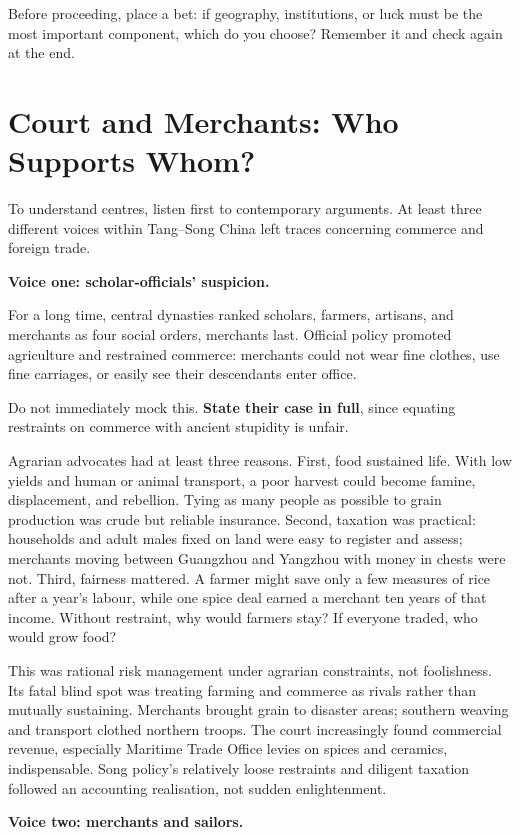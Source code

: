 Before proceeding, place a bet: if geography, institutions, or luck must be the most important component, which do you choose? Remember it and check again at the end.

\section{Court and Merchants: Who Supports Whom?}
To understand centres, listen first to contemporary arguments. At least three different voices within Tang--Song China left traces concerning commerce and foreign trade.

\textbf{Voice one: scholar-officials' suspicion.}

For a long time, central dynasties ranked scholars, farmers, artisans, and merchants as four social orders, merchants last. Official policy promoted agriculture and restrained commerce: merchants could not wear fine clothes, use fine carriages, or easily see their descendants enter office.

Do not immediately mock this. \textbf{State their case in full}, since equating restraints on commerce with ancient stupidity is unfair.

Agrarian advocates had at least three reasons. First, food sustained life. With low yields and human or animal transport, a poor harvest could become famine, displacement, and rebellion. Tying as many people as possible to grain production was crude but reliable insurance. Second, taxation was practical: households and adult males fixed on land were easy to register and assess; merchants moving between Guangzhou and Yangzhou with money in chests were not. Third, fairness mattered. A farmer might save only a few measures of rice after a year's labour, while one spice deal earned a merchant ten years of that income. Without restraint, why would farmers stay? If everyone traded, who would grow food?

This was rational risk management under agrarian constraints, not foolishness. Its fatal blind spot was treating farming and commerce as rivals rather than mutually sustaining. Merchants brought grain to disaster areas; southern weaving and transport clothed northern troops. The court increasingly found commercial revenue, especially Maritime Trade Office levies on spices and ceramics, indispensable. Song policy's relatively loose restraints and diligent taxation followed an accounting realisation, not sudden enlightenment.

\textbf{Voice two: merchants and sailors.}

